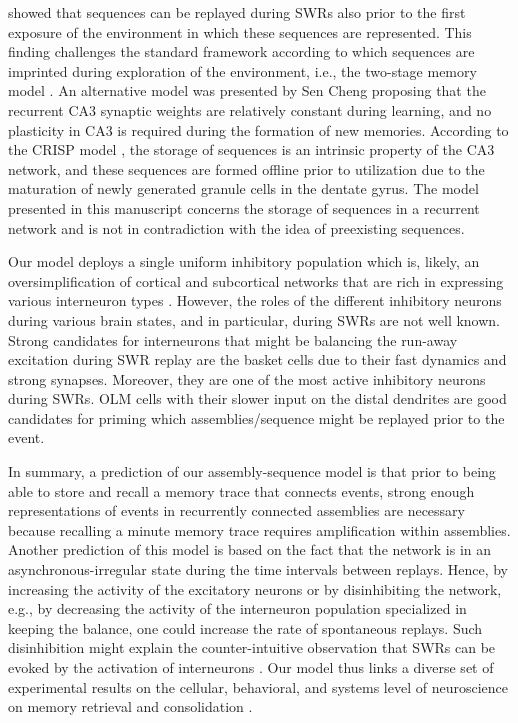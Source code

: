     \cite{Dragoi2011, Dragoi2013} showed that sequences can
    be replayed during SWRs also prior to the first exposure of the environment
    in which these sequences are represented. This finding challenges the
    standard framework according to which sequences are imprinted during
    exploration of the environment, i.e., the two-stage memory model
    \citep{Buzsaki1989}. An alternative model was presented by Sen Cheng
    \citep{ChengS2013} proposing that the recurrent CA3 synaptic weights are
    relatively constant during learning, and no plasticity in CA3 is required
    during the formation of new memories. According to the CRISP model
    \citep{ChengS2013}, the storage of sequences is an intrinsic property of the
    CA3 network, and these sequences are formed offline prior to utilization
    due to the maturation of newly generated granule cells in the dentate
    gyrus. The model presented in this manuscript concerns the storage of
    sequences in a recurrent network and is not in contradiction with the idea
    of preexisting sequences.

    Our model deploys a single uniform inhibitory population which is, likely,
    an oversimplification of cortical and subcortical networks that are rich in
    expressing various interneuron types \citep{Klausberger2008, Kullmann2011}.
    However, the roles of the different inhibitory neurons during various brain
    states, and in particular, during SWRs are not well known. Strong
    candidates for interneurons that might be balancing the run-away excitation
    during SWR replay are the basket cells due to their fast dynamics and
    strong synapses. Moreover, they are one of the most active inhibitory
    neurons during SWRs. OLM cells with their slower input on the distal
    dendrites are good candidates for priming which assemblies/sequence might
    be replayed prior to the event.

    In summary, a prediction of our assembly-sequence model is that prior to
    being able to store and recall a memory trace that connects events, strong
    enough representations of events in recurrently connected assemblies are
    necessary because recalling a minute memory trace requires amplification
    within assemblies. Another prediction of this model is based on the fact
    that the network is in an asynchronous-irregular state during the time
    intervals between replays. Hence, by increasing the activity of the
    excitatory neurons or by disinhibiting the network, e.g., by decreasing the
    activity of the interneuron population specialized in keeping the balance,
    one could increase the rate of spontaneous replays. Such disinhibition
    might explain the counter-intuitive observation that SWRs can be evoked by
    the activation of interneurons \citep{Ellender2010, Schlingloff2014}. Our
    model thus links a diverse set of experimental results on the cellular,
    behavioral, and systems level of neuroscience on memory retrieval and
    consolidation \citep{Diekelmann2010}.

